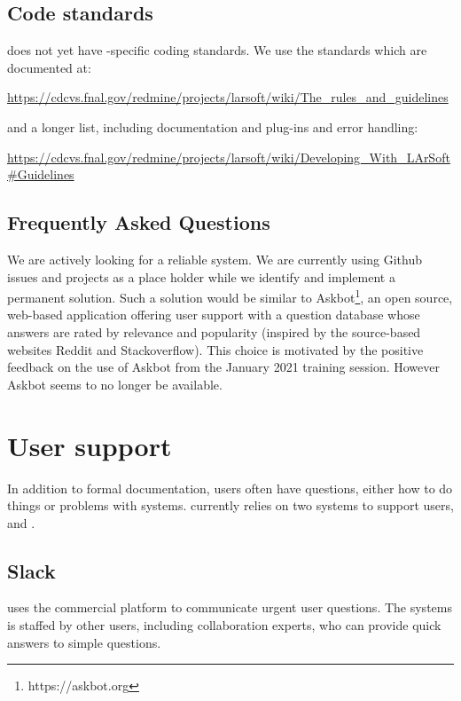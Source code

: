 \documentclass[../main-v1.tex]{subfiles}
\begin{document}
\subsection{Code standards}

 does not yet have -specific coding standards.  We use the  standards which are documented at:

\href{ 
https://cdcvs.fnal.gov/redmine/projects/larsoft/wiki/The_rules_and_guidelines}{https://cdcvs.fnal.gov/redmine/projects/larsoft/wiki/The\_rules\_and\_guidelines}

 

and a longer list, including documentation and plug-ins and error handling:

 

\href{https://cdcvs.fnal.gov/redmine/projects/larsoft/wiki/Developing_With_LArSoft#Guidelines}{https://cdcvs.fnal.gov/redmine/projects/larsoft/wiki/Developing\_With\_LArSoft\#Guidelines}


\subsection{Frequently Asked Questions}
We are actively looking for a reliable system.  We are currently using Github issues and projects as a place holder while we identify and implement a permanent solution.  Such a solution would be similar to Askbot\footnote{https://askbot.org}, an open source, web-based application offering user support with a question database whose answers are rated by relevance and popularity (inspired by the source-based websites Reddit and Stackoverflow). This choice is motivated by the positive feedback on the use of Askbot from the January 2021 training session.  However Askbot seems to no longer be available. 

\section{User support}

In addition to formal documentation, users often have questions, either how to do things or problems with systems.   currently relies on two systems to support users,  and .  

\subsection{Slack}
 uses the commercial  platform to communicate urgent user questions.  The  systems is staffed by other users, including collaboration experts, who can provide quick answers to simple questions. 
\end{document}
